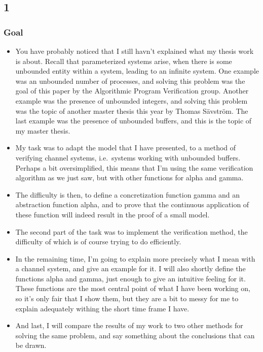 \documentclass[handout]{beamer}
\begin{document}
\begin{footnotesize}
\subsection*{1}
\begin{frame}
  \frametitle{Goal}
  \begin{itemize}
    \item
You have probably noticed that I still havn't explained what my thesis work is about. Recall that parameterized systems arise, when there is some unbounded entity within a system, leading to an infinite system. One example was an unbounded number of processes, and solving this problem was the goal of this paper by the Algorithmic Program Verification group. Another example was the presence of unbounded integers, and solving this problem was the topic of another master thesis this year by Thomas Sävström. The last example was the presence of unbounded buffers, and this is the topic of my master thesis.
\item
My task was to adapt the model that I have presented, to a method of verifying channel systems, i.e.\ systems working with unbounded buffers. Perhaps a bit oversimplified, this means that I'm using the same verification algorithm as we just saw, but with other functions for alpha and gamma.
\item
The difficulty is then, to define a concretization function gamma and an abstraction function alpha, and to prove that the continuous application of these function will indeed result in the proof of a small model.
\item
The second part of the task was to implement the verification method, the difficulty of which is of course trying to do efficiently.
  \end{itemize}
\end{frame}

\begin{frame}
\begin{itemize}
\item
In the remaining time, I'm going to explain more precisely what I mean with a channel system, and give an example for it. I will also shortly define the functions alpha and gamma, just enough to give an intuitive feeling for it. These functions are the most central point of what I have been working on, so it's only fair that I show them, but they are a bit to messy for me to explain adequately withing the short time frame I have.
\item
And last, I will compare the results of my work to two other methods for solving the same problem, and say something about the conclusions that can be drawn.
\end{itemize}
\end{frame}



\end{footnotesize}
\end{document}
